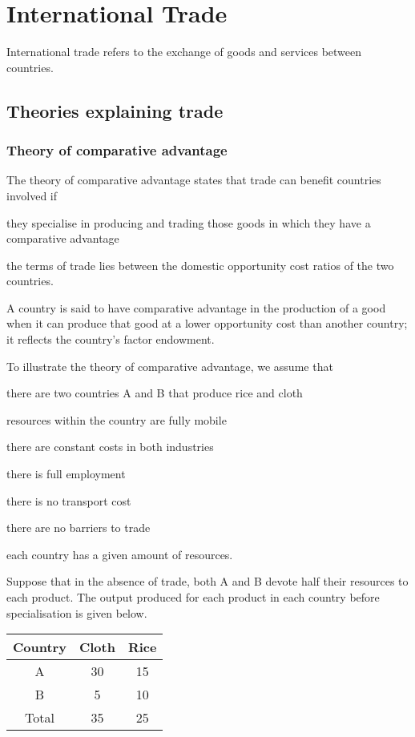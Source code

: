 \documentclass[Economics.tex]{subfiles}
\begin{document}
\chapter{International Trade}
International trade refers to the exchange of goods and services between countries.
\section{Theories explaining trade}
\subsection{Theory of comparative advantage}
The theory of comparative advantage states that trade can benefit countries involved if \begin{slinenum}
\item they specialise in producing and trading those goods in which they have a comparative advantage
\item the terms of trade lies between the domestic opportunity cost ratios of the two countries.
\end{slinenum}

A country is said to have comparative advantage in the production of a good when it can produce that good at a lower opportunity cost than another country; it reflects the country's factor endowment.

To illustrate the theory of comparative advantage, we assume that \begin{slinenum}
\item there are two countries A and B that produce rice and cloth
\item resources within the country are fully mobile
\item there are constant costs in both industries
\item there is full employment
\item there is no transport cost
\item there are no barriers to trade
\item each country has a given amount of resources.
\end{slinenum}

Suppose that in the absence of trade, both A and B devote half their resources to each product. The output produced for each product in each country before specialisation is given below.

{\centering\begin{tabular}{ccc}
\toprule
\textbf{Country} & \textbf{Cloth} & \textbf{Rice} \\
\midrule
A & 30 & 15 \\
B & 5 & 10 \\
Total & 35 & 25 \\
\bottomrule
\end{tabular}}
\end{document}
